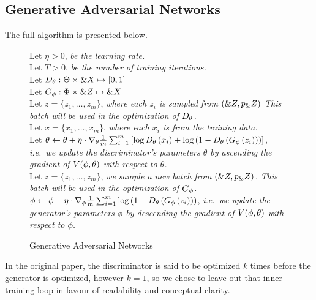 \subsection{Generative Adversarial Networks}

The full algorithm is presented below.

\begin{figure}[H] \centering
  \begin{minipage}{0.95\linewidth}
    \begin{algorithm}[H]
      Let $\eta > 0$, \textit{be the learning rate.} \\
      Let $T > 0$, \textit{be the number of training iterations.} \\
      Let $D_\theta: \Theta \times \&X \mapsto [0, 1]$ \\
      Let $G_\phi: \Phi \times \&Z \mapsto \&X$ \\
       { Let $z = \{z_1, \dots, z_m\}$, \textit{where
          each $z_i$ is sampled from $(\&Z, p_\&Z)$
          This batch will be used in the optimization of $D_\theta$.} \\
        Let $x = \{x_1, \dots, x_m\}$, \textit{where each $x_i$
          is from the training data.} \\
        Let
        $\theta \gets \theta + \eta \cdot \nabla_{\theta} {1 \over m}
        \sum_{i=1}^m \left[ \log{D_\theta\left( x_i\right)} + \log{\left(1 -
              D_\theta\left(G_\phi\left( z_i\right)\right)\right)} \right]$,
        \textit{i.e.\ we update the discriminator's parameters
          $\theta$ by
          ascending the gradient of $V(\phi, \theta)$ with respect to $\theta$.} \\
        Let $z = \{z_1, \dots, z_m\}$, \textit{we sample a new batch
          from $(\&Z, p_\&Z)$. This batch will be used in the
          optimization
          of $G_\phi$.} \\

        $\phi \gets \phi - \eta \cdot \nabla_{\phi} {1 \over m}
        \sum_{i=1}^m \log{\left(1 -
            D_\theta\left(G_\phi\left(z_i\right)\right)\right)}$, \textit{i.e.\
          we update the generator's parameters $\phi$ by descending
          the gradient of $V(\phi, \theta)$ with respect to $\phi$.} \\ }
    \caption{Generative Adversarial Networks}
    \label{algo:main-algo}
  \end{algorithm}
  \end{minipage}
\end{figure}

In the original paper, the discriminator is said to be optimized $k$ times
before the generator is optimized, however $k=1$, so we chose to leave out that
inner training loop in favour of readability and conceptual clarity.

